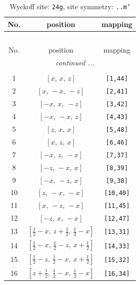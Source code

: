 \documentclass[fleqn,8pt]{jsarticle}
\begin{document}
\begin{longtable}{ccc}
\caption{Wyckoff site: {\tt 24g}, site symmetry: {\tt ..m'}}
 \\
 \hline \hline
No. & position & mapping \\ \hline \endfirsthead

\multicolumn{2}{l}{\tablename\ \thetable{}} \\
 \hline \hline
No. & position & mapping \\ \hline \endhead

 \hline \hline
\multicolumn{2}{r}{\footnotesize\it continued ...} \\ \endfoot

 \hline \hline
\multicolumn{2}{r}{} \\ \endlastfoot

1 & $\left[ x,\, x,\, z \right]$ & {\tt [1,44]} \\ \hline
2 & $\left[ x,\, - x,\, - z \right]$ & {\tt [2,41]} \\ \hline
3 & $\left[ - x,\, x,\, - z \right]$ & {\tt [3,42]} \\ \hline
4 & $\left[ - x,\, - x,\, z \right]$ & {\tt [4,43]} \\ \hline
5 & $\left[ z,\, x,\, x \right]$ & {\tt [5,48]} \\ \hline
6 & $\left[ x,\, z,\, x \right]$ & {\tt [6,46]} \\ \hline
7 & $\left[ - x,\, z,\, - x \right]$ & {\tt [7,37]} \\ \hline
8 & $\left[ - z,\, - x,\, x \right]$ & {\tt [8,39]} \\ \hline
9 & $\left[ - x,\, - z,\, x \right]$ & {\tt [9,38]} \\ \hline
10 & $\left[ z,\, - x,\, - x \right]$ & {\tt [10,40]} \\ \hline
11 & $\left[ x,\, - z,\, - x \right]$ & {\tt [11,45]} \\ \hline
12 & $\left[ - z,\, x,\, - x \right]$ & {\tt [12,47]} \\ \hline
13 & $\left[ \frac{1}{2} - x,\, z + \frac{1}{2},\, \frac{1}{2} - x \right]$ & {\tt [13,31]} \\ \hline
14 & $\left[ \frac{1}{2} - x,\, \frac{1}{2} - z,\, x + \frac{1}{2} \right]$ & {\tt [14,33]} \\ \hline
15 & $\left[ \frac{1}{2} - z,\, \frac{1}{2} - x,\, x + \frac{1}{2} \right]$ & {\tt [15,32]} \\ \hline
16 & $\left[ z + \frac{1}{2},\, \frac{1}{2} - x,\, \frac{1}{2} - x \right]$ & {\tt [16,34]} \\ \hline

\end{longtable}
\end{document}
